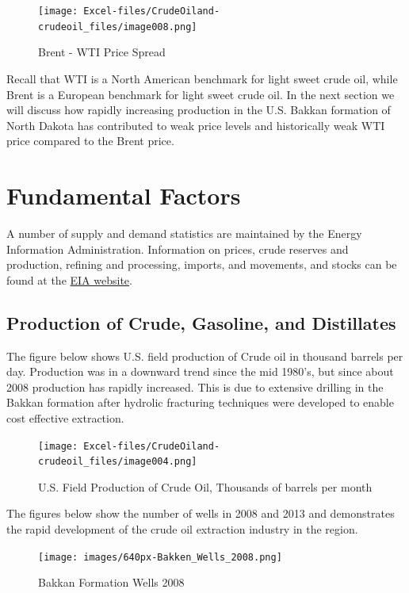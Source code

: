 \documentclass[
]{book}
\begin{document}
\begin{figure}
\centering
\texttt{[image: Excel-files/CrudeOiland-crudeoil\_files/image008.png]}
\caption{Brent - WTI Price Spread}
\end{figure}

Recall that WTI is a North American benchmark for light sweet crude oil, while Brent is a European benchmark for light sweet crude oil. In the next section we will discuss how rapidly increasing production in the U.S. Bakkan formation of North Dakota has contributed to weak price levels and historically weak WTI price compared to the Brent price.

\hypertarget{fundamental-factors}{%
\section{Fundamental Factors}\label{fundamental-factors}}

A number of supply and demand statistics are maintained by the Energy Information Administration. Information on prices, crude reserves and production, refining and processing, imports, and movements, and stocks can be found at the \href{http://www.eia.gov/petroleum/data.cfm}{EIA website}.

\hypertarget{production-of-crude-gasoline-and-distillates}{%
\subsection{Production of Crude, Gasoline, and Distillates}\label{production-of-crude-gasoline-and-distillates}}

The figure below shows U.S. field production of Crude oil in thousand barrels per day. Production was in a downward trend since the mid 1980's, but since about 2008 production has rapidly increased. This is due to extensive drilling in the Bakkan formation after hydrolic fracturing techniques were developed to enable cost effective extraction.

\begin{figure}
\centering
\texttt{[image: Excel-files/CrudeOiland-crudeoil\_files/image004.png]}
\caption{U.S. Field Production of Crude Oil, Thousands of barrels per month}
\end{figure}

The figures below show the number of wells in 2008 and 2013 and demonstrates the rapid development of the crude oil extraction industry in the region.

\begin{figure}
\centering
\texttt{[image: images/640px-Bakken\_Wells\_2008.png]}
\caption{Bakkan Formation Wells 2008}
\end{figure}
\end{document}
